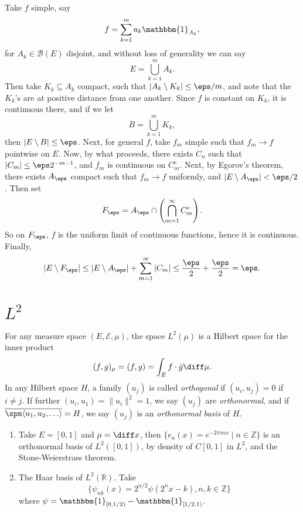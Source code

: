 \documentclass[12pt]{article}
\begin{document}
\begin{proofbox}
	Take $f$ simple, say
	\[
	f = \sum_{k = 1}^m a_k \mathbbm{1}_{A_k},
	\]
	for $A_k \in \mathcal{B}(E)$ disjoint, and without loss of generality we can say
	\[
	E = \bigcup_{k = 1}^m A_k.
	\]
	Then take $K_k \subseteq A_k$ compact, such that $|A_k \setminus K_k| \leq \eps/m$, and note that the $K_k$'s are at positive distance from one another. Since $f$ is constant on $K_k$, it is continuous there, and if we let
	\[
	B = \bigcup_{k = 1}^m K_k,
	\]
	then $|E\setminus B| \leq \eps$. Next, for general $f$, take $f_m$ simple such that $f_m \to f$ pointwise on $E$. Now, by what proceeds, there exists $C_n$ such that $|C_m| \leq \eps 2^{-m-1}$, and $f_m$ is continuous on $C_m^{c}$. Next, by Egorov's theorem, there exists $A_\eps$ compact such that $f_m \to f$ uniformly, and $|E \setminus A_\eps| < \eps/2$. Then set
	\[
	F_\eps = A_\eps \cap \left( \bigcap_{m = 1}^{\infty} C_m^{c} \right).
	\]
	So on $F_\eps$, $f$ is the uniform limit of continuous functions, hence it is continuous. Finally,
	\[
	|E \setminus F_\eps| \leq |E \setminus A_\eps| + \sum_{m = 1}^{\infty} |C_m| \leq \frac{\eps}{2} + \frac{\eps}{2} = \eps.
	\]
\end{proofbox}

\newpage

\section{\texorpdfstring{$L^2$}{L\^2}}
\label{sec:l^2}

For any measure space $(E, \mathcal{E}, \mu)$, the space $L^2(\mu)$ is a Hilbert space for the inner product
\[
	(f, g)_\mu = (f, g) = \int_E f \cdot \bar g \diff \mu.
\]
In any Hilbert space $H$, a family $(u_j)$ is called \emph{orthogonal} if $(u_i, u_j) = 0$ if $i \neq j$. If further $(u_i, u_1) = \|u_i\|^2 = 1$, we say $(u_j)$ are \emph{orthonormal}, and if $\overline{\spn\langle u_1, u_2, \ldots \rangle} = H$, we say $(u_j)$ is an \emph{orthonormal basis} of $H$.

\begin{exbox}
	\begin{enumerate}
		\item Take $E = [0, 1]$ and $\mu = \diff x$, then $\{e_n(x) = e^{-2 \pi i n x} \mid n \in \mathbb{Z}\}$ is an orthonormal basis of $L^2([0, 1])$, by density of $C[0, 1]$ in $L^2$, and the Stone-Weierstrass theorem.
		\item The Haar basis of $L^2(\mathbb{R})$. Take
			\[
				\{\psi_{nk}(x) = 2^{n/2} \psi(2^{n}x - k), n, k \in \mathbb{Z}\}
			\]
			where $\psi = \mathbbm{1}_{[0, 1/2)} - \mathbbm{1}_{[1/2, 1)}$.
	\end{enumerate}
\end{exbox}
\end{document}
